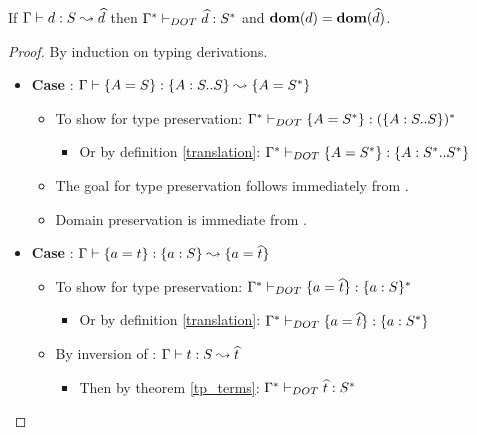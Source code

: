 \begin{THEOREM}
    \label{tp_defs}
    If $\Gamma \vdash d: S \leadsto \widehat{d}$ then
    $\Gamma^{*} \vdash_{DOT} \widehat{d}: S^{*}$ and $\textbf{dom}(d) =
    \textbf{dom}(\widehat{d})$.
\end{THEOREM}

\begin{proof}
    By induction on typing derivations.
    \begin{itemize}
        \item \textbf{Case} :
            $\Gamma \vdash \{A = S\}: \{A : S .. S\} \leadsto \{A = S^{*}\}$
        \begin{itemize}
            \item To show for type preservation: $\Gamma^{*} \vdash_{DOT} \{A = S^{*}\}: (\{A : S .. S\})^{*}$
            \begin{itemize}
                \item Or by definition \ref{translation}: $\Gamma^{*} \vdash_{DOT} \{A = S^{*}\}: \{A : S^{*} .. S^{*}\}$
            \end{itemize}
            \item The goal for type preservation follows immediately from
                .
            \item Domain preservation is immediate from .
        \end{itemize}
        \item \textbf{Case} :
            $\Gamma \vdash \{a = t\}: \{a : S\} \leadsto \{a = \widehat{t}\}$
        \begin{itemize}
            \item To show for type preservation:
                $\Gamma^{*} \vdash_{DOT} \{a = \widehat{t}\}: \{a : S\}^{*}$
            \begin{itemize}
                \item Or by definition \ref{translation}: $\Gamma^{*} \vdash_{DOT} \{a = \widehat{t}\}: \{a : S^{*}\}$
            \end{itemize}
            \item By inversion of : $\Gamma \vdash t: S \leadsto \widehat{t}$
            \begin{itemize}
                \item Then by theorem \ref{tp_terms}:
                    $\Gamma^{*} \vdash_{DOT} \widehat{t}: S^{*}$
            \end{itemize}

\end{itemize}
\end{itemize}
\end{proof}
